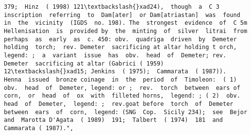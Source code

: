 \documentclass[11pt]{article}
\begin{document}
\begin{Verbatim}[commandchars=\\\{\}]
379;  Hinz  ( 1998) 121\textbackslash{}xad24),  though  a  C 3  inscription  referring  to  Dam[ater]  or Dam[atriastan]  was  found  in  the  vicinity  (IGDS  no. 198). The  strongest  evidence  of  C 5m  Hellenisation  is  provided by  the  minting  of  silver  litrai  from  perhaps  as  early  as  c. 450: obv.  quadriga  driven  by  Demeter  holding  torch;  rev. Demeter  sacrificing at altar holding t orch,  legend: ;  a  variant  issue  has  obv.  head  of  Demeter; rev.  Demeter  sacrificing at altar (Gabrici ( 1959)  12\textbackslash{}xad15; Jenkins  ( 1975);  Cammarata  ( 1987)).  Henna  issued  bronze coinage  in  the  period  of  Timoleon:  ( 1)  obv.  head  of  Demeter, legend: or ;  rev.  torch  between  ears of  corn,  or  head  of  ox  with  filleted horns,  legend: ; ( 2)  obv.  head  of  Demeter,  legend: ;  rev.goat before  torch  of  Demeter  between  ears  of  corn,  legend: (SNG  Cop.  Sicily 234);  see  Bejor  and  Marotta D'Agata  ( 1989)  191;  Talbert  ( 1974)  181  and  Cammarata ( 1987).",

\end{Verbatim}
\end{document}
